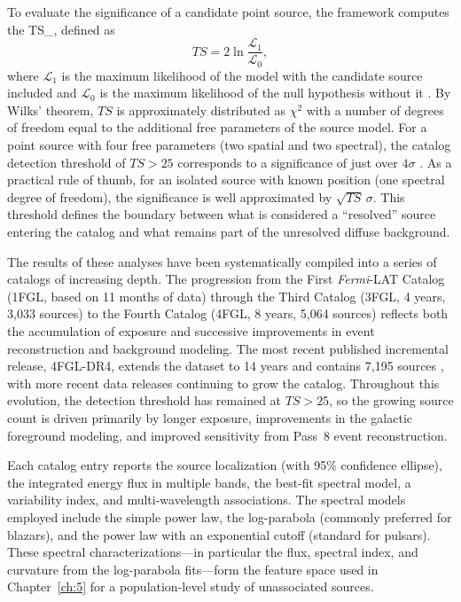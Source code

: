 To evaluate the significance of a candidate point source, the framework computes the \gls{TS_}, defined as \[ TS = 2\ln\frac{\mathcal{L}_1}{\mathcal{L}_0}, \] where $\mathcal{L}_1$ is the maximum likelihood of the model with the candidate source included and $\mathcal{L}_0$ is the maximum likelihood of the null hypothesis without it \cite{Mattox:1996zz}.
By Wilks' theorem, $TS$ is approximately distributed as $\chi^2$ with a number of degrees of freedom equal to the additional free parameters of the source model.
For a point source with four free parameters (two spatial and two spectral), the catalog detection threshold of $TS > 25$ corresponds to a significance of just over $4\sigma$ \cite{Fermi-LAT:2015bhf,Fermi-LAT:2019yla}.
As a practical rule of thumb, for an isolated source with known position (one spectral degree of freedom), the significance is well approximated by $\sqrt{TS}\,\sigma$.
This threshold defines the boundary between what is considered a ``resolved'' source entering the catalog and what remains part of the unresolved diffuse background.

The results of these analyses have been systematically compiled into a series of catalogs of increasing depth.
The progression from the First \textit{Fermi}-LAT Catalog (1FGL, based on 11 months of data) through the Third Catalog (3FGL, 4 years, 3,033 sources) to the Fourth Catalog (4FGL, 8 years, 5,064 sources) \cite{Fermi-LAT:2015bhf,Fermi-LAT:2019yla} reflects both the accumulation of exposure and successive improvements in event reconstruction and background modeling.
The most recent published incremental release, 4FGL-DR4, extends the dataset to 14 years and contains 7,195 sources \cite{Ballet:2023qzs}, with more recent data releases continuing to grow the catalog.
Throughout this evolution, the detection threshold has remained at $TS > 25$, so the growing source count is driven primarily by longer exposure, improvements in the galactic foreground modeling, and improved sensitivity from Pass~8 event reconstruction.

Each catalog entry reports the source localization (with 95\% confidence ellipse), the integrated energy flux in multiple bands, the best-fit spectral model, a variability index, and multi-wavelength associations.
The spectral models employed include the simple power law, the log-parabola (commonly preferred for blazars), and the power law with an exponential cutoff (standard for pulsars).
These spectral characterizations---in particular the flux, spectral index, and curvature from the log-parabola fits---form the feature space used in Chapter~\ref{ch:5} for a population-level study of unassociated sources.

